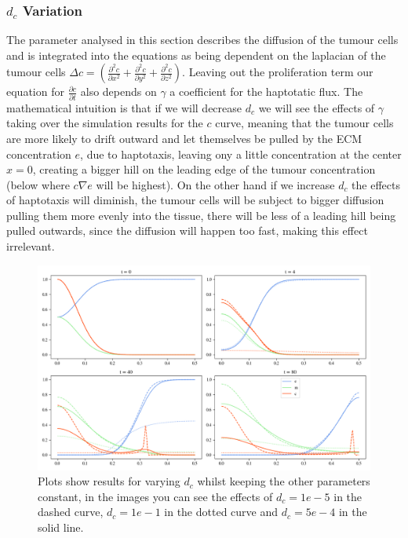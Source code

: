\subsubsection*{$d_c$ Variation}
The parameter analysed in this section describes the diffusion of the tumour cells and is integrated into the equations as being dependent on the laplacian of the tumour cells $\Delta c = (\frac{\partial^2 c}{\partial x^2} + \frac{\partial^2 c}{\partial y^2} + \frac{\partial^2 c}{\partial z^2})$. Leaving out the proliferation term our equation for $\frac{\partial c}{\partial t}$ also depends on $\gamma$ a coefficient for the haptotatic flux. The mathematical intuition is that if we will decrease $d_c$ we will see the effects of $\gamma$ taking over the simulation results for the $c$ curve, meaning that the tumour cells are more likely to drift outward and let themselves be pulled by the ECM concentration $e$, due to haptotaxis, leaving ony a little concentration at the center $x=0$, creating a bigger hill on the leading edge of the tumour concentration (below where $c \nabla e$ will be highest). On the other hand if we increase $d_c$ the effects of haptotaxis will diminish, the tumour cells will be subject to bigger diffusion pulling them more evenly into the tissue, there will be less of a leading hill being pulled outwards, since the diffusion will happen too fast, making this effect irrelevant. 
\begin{figure}[h]
    \centering
    \includegraphics[width=\textwidth]{resources/images/dc_variation.png}
    \caption{Plots show results for varying $d_c$ whilst keeping the other parameters constant, in the images you can see the effects of $d_c=1e-5$ in the dashed curve, $d_c=1e-1$ in the dotted curve and $d_c=5e-4$ in the solid line.}
    \label{fig:dc_comparison}
\end{figure}
